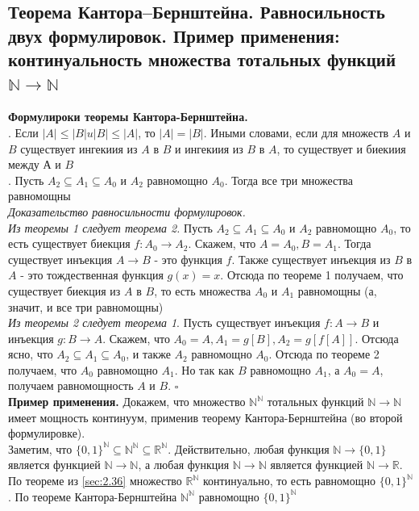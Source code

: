 \documentclass[a4paper]{article}
\newcommand{\qed}{\hfill$\square$}
\begin{document}
\subsection{Теорема Кантора–Бернштейна. Равносильность двух формулировок. Пример применения: континуальность множества тотальных функций $\mathbb{N}\rightarrow\mathbb{N}$}
\textbf{Формулироки теоремы Кантора-Бернштейна.}\\[2mm]
. Если $|A| \leqslant|B| u|B| \leqslant|A|$, то $|A|=|B|$. Иными словами, если для множеств $A$ и $B$ существует ингекиия из $A$ в $B$ и ингекиия из $B$ в $A$, то существует и биекиия между $А$ и $B$\\[2mm]
. Пусть $A_{2} \subseteq A_{1} \subseteq A_{0}$ и $A_{2}$ равномощно $A_{0}$. Тогда все три множества равномощны\\[2mm]
\textit{Доказательство равносильности формулировок.}\\[2mm]
\indent \textit{Из теоремы 1 следует теорема 2.} Пусть $A_{2} \subseteq A_{1} \subseteq A_{0}$ и $A_{2}$ равномощно $A_{0}$, то есть существует биекция $f: A_{0} \rightarrow A_{2}$. Скажем, что $A=A_{0}, B=A_{1}$. Тогда существует инъекция $A \rightarrow B$ - это функция $f$. Также существует инъекция из $B$ в $A$ - это тождественная функция $g(x)=x$. Отсюда по теореме 1 получаем, что существует биекция из $A$ в $B$, то есть множества $A_{0}$ и $A_{1}$ равномощны (а, значит, и все три равномощны)\\[2mm]
\indent \textit{Из теоремы 2 следует теорема 1}. Пусть существует инъекция $f: A \rightarrow B$ и инъекция $g: B \rightarrow A$. Скажем, что $A_{0}=A, A_{1}=g[B], A_{2}=g[f[A]]$. Отсюда ясно, что $A_{2} \subseteq A_{1} \subseteq A_{0}$, и также $A_{2}$ равномощно $A_{0}$. Отсюда по теореме 2 получаем, что $A_{0}$ равномощно $A_{1}$. Но так как $B$ равномощно $A_{1}$, а $A_{0}=A$, получаем равномощность $A$ и $B$. \qed\\[2mm]
\textbf{Пример применения.} Докажем, что множество $\mathbb{N}^{\mathbb{N}}$ тотальных функций $\mathbb{N}\rightarrow\mathbb{N}$ имеет мощность континуум, применив теорему Кантора-Бернштейна (во второй формулировке).\\[2mm]
\indent Заметим, что $\{0,1\}^{\mathbb{N}} \subseteq \mathbb{N}^{\mathbb{N}} \subseteq \mathbb{R}^{\mathbb{N}}$. Действительно, любая функция $\mathbb{N} \rightarrow\{0,1\}$ является функцией $\mathbb{N} \rightarrow \mathbb{N}$, а любая функция $\mathbb{N} \rightarrow \mathbb{N}$ является функцией $\mathbb{N} \rightarrow \mathbb{R}$. По теореме из \ref{sec:2.36} множество $\mathbb{R}^{\mathbb{N}}$ континуально, то есть равномощно $\{0,1\}^{\mathbb{N}}$. По теореме Кантора-Бернштейна $\mathbb{N}^{\mathbb{N}}$ равномощно $\{0,1\}^{\mathbb{N}}$
\end{document}
